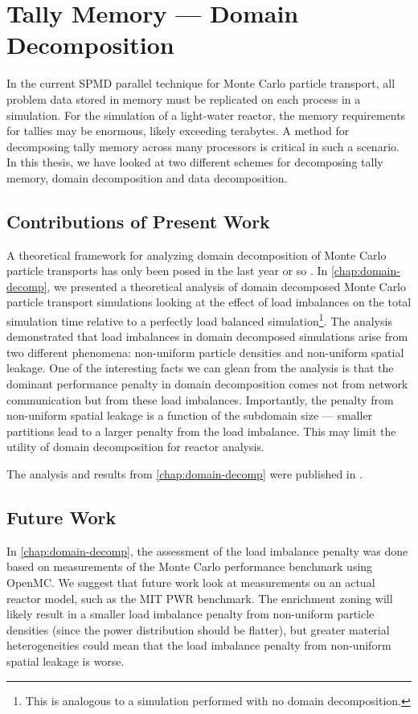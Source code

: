 \section{Tally Memory --- Domain Decomposition}

In the current SPMD parallel technique for Monte Carlo particle transport, all
problem data stored in memory must be replicated on each process in a
simulation. For the simulation of a light-water reactor, the memory requirements
for tallies may be enormous, likely exceeding terabytes. A method for
decomposing tally memory across many processors is critical in such a
scenario. In this thesis, we have looked at two different schemes for
decomposing tally memory, domain decomposition and data decomposition.

\subsection{Contributions of Present Work}

A theoretical framework for analyzing domain decomposition of Monte Carlo
particle transports has only been posed in the last year or so
\cite{jcp-siegel-2012-1}. In \autoref{chap:domain-decomp}, we presented a
theoretical analysis of domain decomposed Monte Carlo particle transport
simulations looking at the effect of load imbalances on the total simulation
time relative to a perfectly load balanced simulation\footnote{This is analogous
  to a simulation performed with no domain decomposition.}. The analysis
demonstrated that load imbalances in domain decomposed simulations arise from
two different phenomena: non-uniform particle densities and non-uniform spatial
leakage. One of the interesting facts we can glean from the analysis is that the
dominant performance penalty in domain decomposition comes not from network
communication but from these load imbalances. Importantly, the penalty from
non-uniform spatial leakage is a function of the subdomain size --- smaller
partitions lead to a larger penalty from the load imbalance. This may limit the
utility of domain decomposition for reactor analysis.

The analysis and results from \autoref{chap:domain-decomp} were published in
\cite{jcp-siegel-2012-2}.

\subsection{Future Work}

In \autoref{chap:domain-decomp}, the assessment of the load imbalance penalty
was done based on measurements of the Monte Carlo performance benchmark using
OpenMC. We suggest that future work look at measurements on an actual reactor
model, such as the MIT PWR benchmark. The enrichment zoning will likely result
in a smaller load imbalance penalty from non-uniform particle densities (since
the power distribution should be flatter), but greater material heterogeneities
could mean that the load imbalance penalty from non-uniform spatial leakage is
worse.

